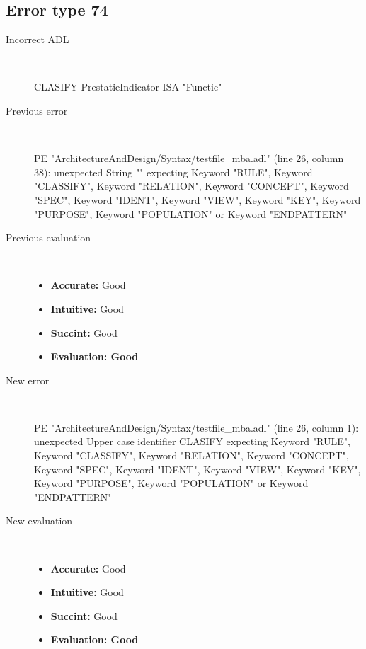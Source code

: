 \hrulefill

\subsection{Error type 74}
  \begin{description}
  \item[Incorrect ADL]~\\
\begin{adl}
CLASIFY PrestatieIndicator ISA "Functie"\end{adl}
  \item[Previous error]~\\
\begin{haskell}
PE "ArchitectureAndDesign/Syntax/testfile_mba.adl" (line 26, column 38):
unexpected String ""
expecting Keyword "RULE", Keyword "CLASSIFY", Keyword "RELATION", Keyword "CONCEPT", Keyword "SPEC", Keyword "IDENT", Keyword "VIEW", Keyword "KEY", Keyword "PURPOSE", Keyword "POPULATION" or Keyword "ENDPATTERN"\end{haskell}
  \item[Previous evaluation]~\\
    \begin{itemize}
    \item \textbf{Accurate:} Good
    \item \textbf{Intuitive:} Good
    \item \textbf{Succint:} Good
    \item \textbf{Evaluation: Good}
    \end{itemize}
  \item[New error]~\\
\begin{haskell}
PE "ArchitectureAndDesign/Syntax/testfile_mba.adl" (line 26, column 1):
unexpected Upper case identifier CLASIFY
expecting Keyword "RULE", Keyword "CLASSIFY", Keyword "RELATION", Keyword "CONCEPT", Keyword "SPEC", Keyword "IDENT", Keyword "VIEW", Keyword "KEY", Keyword "PURPOSE", Keyword "POPULATION" or Keyword "ENDPATTERN"
\end{haskell}
  \item[New evaluation]~\\
    \begin{itemize}
    \item \textbf{Accurate:} Good
    \item \textbf{Intuitive:} Good
    \item \textbf{Succint:} Good
    \item \textbf{Evaluation: Good
}
    \end{itemize}
  \end{description}


